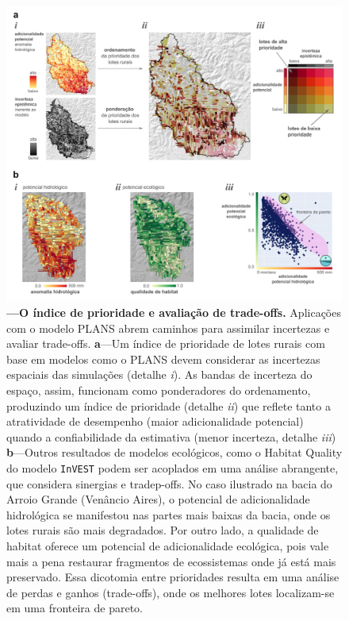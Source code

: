 \documentclass[./main.tex]{subfiles}
\begin{document}
\begin{figure}[t!] 
\centering				
\includegraphics[width=0.98\linewidth]{figs/fig_index.jpg}		
\caption[O índice de prioridade e trade-offs]
{\textbf{---\;O índice de prioridade e avaliação de trade-offs.}
    Aplicações com o modelo PLANS abrem caminhos para assimilar incertezas e avaliar trade-offs.
    \;\textbf{a}\;---\;Um índice de prioridade de lotes rurais com base em modelos como o PLANS devem considerar as incertezas espaciais das simulações (detalhe \textrm{\textit{i}}). As bandas de incerteza do espaço, assim, funcionam como ponderadores do ordenamento, produzindo um índice de prioridade (detalhe \textrm{\textit{ii}}) que reflete tanto a atratividade de desempenho (maior adicionalidade potencial) quando a confiabilidade da estimativa (menor incerteza, detalhe \textrm{\textit{iii}})   
    \;\textbf{b}\;---\;Outros resultados de modelos ecológicos, como o Habitat Quality do modelo \texttt{InVEST} podem ser acoplados em uma análise abrangente, que considera sinergias e tradep-offs. No caso ilustrado na bacia do Arroio Grande (Venâncio Aires), o potencial de adicionalidade hidrológica se manifestou nas partes mais baixas da bacia, onde os lotes rurais são mais degradados. Por outro lado, a qualidade de habitat oferece um potencial de adicionalidade ecológica, pois vale mais a pena restaurar fragmentos de ecossistemas onde já está mais preservado. Essa dicotomia entre prioridades resulta em uma análise de perdas e ganhos (trade-offs), onde os melhores lotes localizam-se em uma fronteira de pareto.
}
\label{fig:eco:addplans3} 		
\end{figure}
\end{document}
